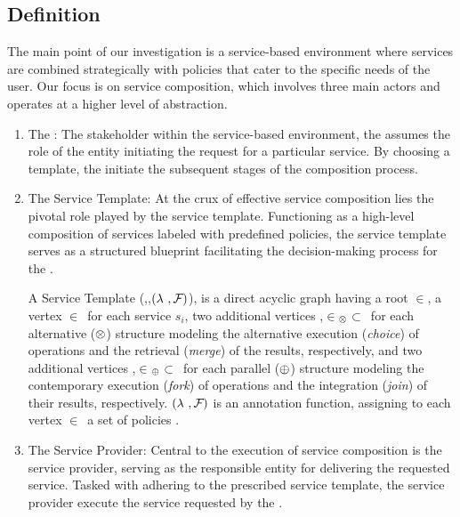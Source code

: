 \subsection{Definition}
The main point of our investigation is a service-based environment where services are combined strategically with policies that cater to the specific needs of the user.
Our focus is on service composition, which involves three main actors and operates at a higher level of abstraction.
\begin{enumerate}
  \item The \User:
        The stakeholder within the service-based environment,
        the \user assumes the role of the entity initiating the request for a particular service.
        By choosing a template, the \user initiate the subsequent stages of the composition process.
  \item The Service Template:
        At the crux of effective service composition lies the pivotal role played by the service template.
        Functioning as a high-level composition of services labeled with predefined policies,
        the service template serves as a structured blueprint facilitating the decision-making process for the  \user.
        \begin{definition} \label{def:pipeline}
          A Service Template \T(\V,\E,$(\lambda~,\mathcal{F}_{}){}$), is a direct acyclic graph having a root $\in$\V, a vertex $\in$\V\ for each service $s_i$,
          two additional vertices ,$\in$\V$_{\otimes}$$\subset$\V\ for each alternative ($\otimes$) structure modeling the alternative execution (\emph{choice}) of operations and the retrieval (\emph{merge}) of the results,
                respectively, and two additional vertices ,$\in$\V$_{\oplus}$$\subset$\V\ for each parallel ($\oplus$) structure modeling the contemporary execution (\emph{fork}) of operations and the integration (\emph{join}) of their results, respectively. $(\lambda~,\mathcal{F}_{}){}$ is an annotation function, assigning to each vertex $\in$\V\ a set of policies .
        \end{definition}
  \item The Service Provider:
        Central to the execution of service composition is the service provider,
        serving as the responsible entity for delivering the requested service.
        Tasked with adhering to the prescribed service template, the service provider execute the service requested by the \user.
\end{enumerate}


